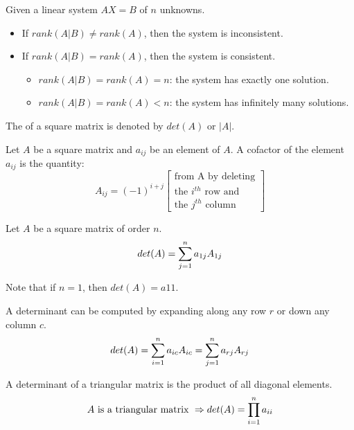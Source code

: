     \par Given a linear system $AX = B$ of $n$ unknowns.
    \begin{itemize}
      \item If $rank(A|B) \neq rank(A)$, then the system is inconsistent.
      \item If $rank(A|B) = rank(A)$, then the system is consistent.
        \begin{itemize}
          \item $rank(A|B) = rank(A) = n$: the system has exactly one
            solution.
          \item $rank(A|B) = rank(A) < n$: the system has infinitely
            many solutions.
        \end{itemize}
    \end{itemize}

    \par The  of a square matrix is denoted by $det(A)$ or $|A|$.
    \par Let $A$ be a square matrix and $a_{ij}$ be an element of $A$. A cofactor of
    the element $a_{ij}$ is the quantity:
    \[
      A_{ij} = (-1)^{i + j}
      \begin{bmatrix}
        \mbox{from A by deleting} \\
        \mbox{the $i^{th}$ row and} \\
        \mbox{the $j^{th}$ column}
      \end{bmatrix}
    \]

    \par Let $A$ be a square matrix of order $n$.
    \[
      det(A) = \sum\limits _{j = 1}^{n} a_{1j} A_{1j}
    \]
    \par Note that if $n = 1$, then $det(A) = a{11}$.

      \par A determinant can be computed by expanding along any row $r$ or
      down any column $c$.
      \[
        det(A) = \sum\limits _{i = 1}^{n} a_{ic} A_{ic}
               = \sum\limits _{j = 1}^{n} a_{rj} A_{rj}
      \]

      \par A determinant of a triangular matrix is the product of all diagonal
      elements.
      \[
        A \text{ is a triangular matrix }
          \Rightarrow det(A) = \prod\limits _{i = 1}^{n} a_{ii}
      \]

